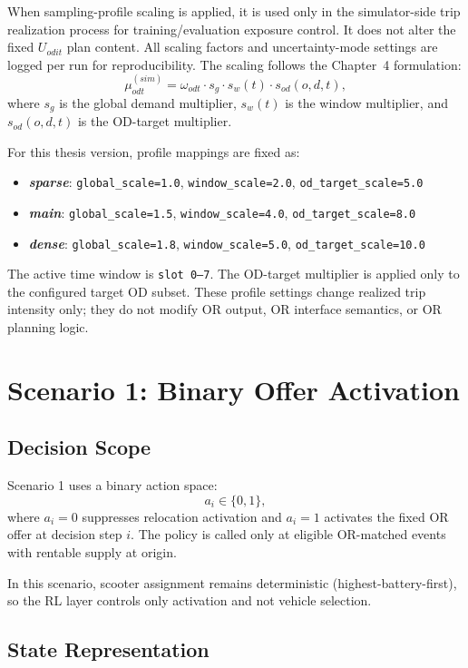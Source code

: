 When sampling-profile scaling is applied, it is used only in the simulator-side trip realization process for training/evaluation exposure control. It does not alter the fixed \(U_{odit}\) plan content. All scaling factors and uncertainty-mode settings are logged per run for reproducibility.
The scaling follows the Chapter~4 formulation:
\[
\mu_{odt}^{(sim)}=\omega_{odt}\cdot s_g \cdot s_w(t)\cdot s_{od}(o,d,t),
\]
where \(s_g\) is the global demand multiplier, \(s_w(t)\) is the window multiplier, and \(s_{od}(o,d,t)\) is the OD-target multiplier.

For this thesis version, profile mappings are fixed as:
\begin{itemize}
\item \textbf{\textit{sparse}}: \texttt{global\_scale=1.0}, \texttt{window\_scale=2.0}, \texttt{od\_target\_scale=5.0}
\item \textbf{\textit{main}}: \texttt{global\_scale=1.5}, \texttt{window\_scale=4.0}, \texttt{od\_target\_scale=8.0}
\item \textbf{\textit{dense}}: \texttt{global\_scale=1.8}, \texttt{window\_scale=5.0}, \texttt{od\_target\_scale=10.0}
\end{itemize}
The active time window is \texttt{slot 0--7}. The OD-target multiplier is applied only to the configured target OD subset. These profile settings change realized trip intensity only; they do not modify OR output, OR interface semantics, or OR planning logic.

\section{Scenario 1: Binary Offer Activation}

\subsection{Decision Scope}

Scenario 1 uses a binary action space:
\[
a_i \in \{0,1\},
\]
where \(a_i=0\) suppresses relocation activation and \(a_i=1\) activates the fixed OR offer at decision step \(i\). The policy is called only at eligible OR-matched events with rentable supply at origin.

In this scenario, scooter assignment remains deterministic (highest-battery-first), so the RL layer controls only activation and not vehicle selection.

\subsection{State Representation}

